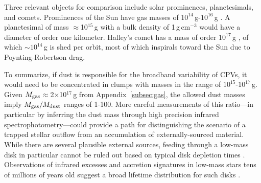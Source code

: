 \documentclass[11pt,twocolumn,tighten,linenumbers]{aastex7}
\begin{document}
Three relevant objects for comparison include solar prominences,
planetesimals, and comets.  Prominences of the Sun have gas masses of
$10^{14}$\,g-$10^{16}$\,g \citep{VialEngvold2015}.  A planetesimal of
mass $\approx$10$^{15}$\,g with a bulk density of 1\,g\,cm$^{-3}$
would have a diameter of order one kilometer.  Halley's comet has a
mass of order $10^{17}$\,g \citep{Rickman1989}, of which
$\sim$$10^{14}$\,g is shed per orbit, most of which inspirals toward
the Sun due to Poynting-Robertson drag.

To summarize, if dust is responsible for the broadband variability of
CPVs, it would need to be concentrated in clumps with masses in the
range of $10^{15}$-$10^{17}$\,g.  Given $M_{\rm
gas}$$\approx$2$\times$10$^{17}$\,g from Appendix~\ref{subsec:gas}, the
allowed dust masses imply $M_{\rm gas}/M_{\rm dust}$ ranges of 1-100.
More careful measurements of this ratio---in particular by inferring
the dust mass through high precision infrared
spectrophotometry---could provide a path for distinguishing the
scenario of a trapped stellar outflow from an accumulation of
externally-sourced material.  While there are several plausible
external sources, feeding through a low-mass disk in particular cannot
be ruled out based on typical disk depletion times \citep{Haisch2001}.
Observations of infrared excesses and accretion signatures in low-mass
stars tens of millions of years old suggest a broad lifetime
distribution for such disks
\citep{Silverberg2020,Lee2020,Gaidos2022,Pfalzner2024}.


\end{document}
